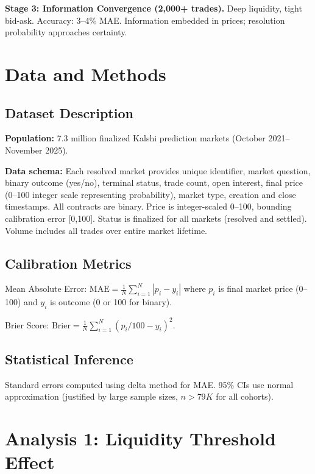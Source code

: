 \documentclass[a4paper,11pt]{article}
\theoremstyle{plain}
\theoremstyle{definition}
\begin{document}
\textbf{Stage 3: Information Convergence (2,000+ trades).} Deep liquidity, tight bid-ask. Accuracy: 3--4\% MAE. Information embedded in prices; resolution probability approaches certainty.

\section{Data and Methods}
\label{sec:data}

\subsection{Dataset Description}

\textbf{Population:} 7.3 million finalized Kalshi prediction markets (October 2021--November 2025).

\textbf{Data schema:} Each resolved market provides unique identifier, market question, binary outcome (yes/no), terminal status, trade count, open interest, final price (0--100 integer scale representing probability), market type, creation and close timestamps. All contracts are binary. Price is integer-scaled 0--100, bounding calibration error [0,100]. Status is finalized for all markets (resolved and settled). Volume includes all trades over entire market lifetime.

\subsection{Calibration Metrics}

Mean Absolute Error: $\text{MAE} = \frac{1}{N} \sum_{i=1}^{N} |p_i - y_i|$ where $p_i$ is final market price (0--100) and $y_i$ is outcome (0 or 100 for binary).

Brier Score: $\text{Brier} = \frac{1}{N} \sum_{i=1}^{N} (p_i/100 - y_i)^2$.

\subsection{Statistical Inference}

Standard errors computed using delta method for MAE. 95\% CIs use normal approximation (justified by large sample sizes, $n > 79K$ for all cohorts).

\section{Analysis 1: Liquidity Threshold Effect}
\label{sec:analysis1}
\end{document}
